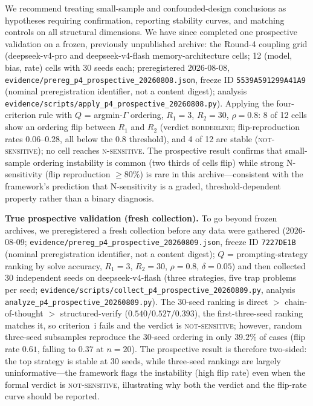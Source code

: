 \documentclass[11pt]{article}
\begin{document}
We recommend treating small-sample and confounded-design conclusions as hypotheses requiring confirmation, reporting stability curves, and matching controls on all structural dimensions. We have since completed one prospective validation on a frozen, previously unpublished archive: the Round-4 coupling grid (deepseek-v4-pro and deepseek-v4-flash memory-architecture cells; 12 (model, bias, rate) cells with 30 seeds each; preregistered 2026-08-08, \texttt{evidence/prereg\_p4\_prospective\_20260808.json}, freeze ID \texttt{5539A591299A41A9} (nominal preregistration identifier, not a content digest); analysis \texttt{evidence/scripts/apply\_p4\_prospective\_20260808.py}). Applying the four-criterion rule with $Q$ = argmin-$\Gamma$ ordering, $R_1{=}3$, $R_2{=}30$, $\rho{=}0.8$: 8 of 12 cells show an ordering flip between $R_1$ and $R_2$ (verdict \textsc{borderline}; flip-reproduction rates 0.06--0.28, all below the 0.8 threshold), and 4 of 12 are stable (\textsc{not-sensitive}); no cell reaches \textsc{n-sensitive}. The prospective result confirms that small-sample ordering instability is common (two thirds of cells flip) while strong N-sensitivity (flip reproduction $\geq 80\%$) is rare in this archive---consistent with the framework's prediction that N-sensitivity is a graded, threshold-dependent property rather than a binary diagnosis.

\noindent\textbf{True prospective validation (fresh collection).} To go beyond frozen archives, we preregistered a fresh collection before any data were gathered (2026-08-09; \texttt{evidence/prereg\_p4\_prospective\_20260809.json}, freeze ID \texttt{7227DE1B} (nominal preregistration identifier, not a content digest); $Q$ = prompting-strategy ranking by solve accuracy, $R_1{=}3$, $R_2{=}30$, $\rho{=}0.8$, $\delta{=}0.05$) and then collected 30 independent seeds on deepseek-v4-flash (three strategies, five trap problems per seed; \texttt{evidence/scripts/collect\_p4\_prospective\_20260809.py}, analysis \texttt{analyze\_p4\_prospective\_20260809.py}). The 30-seed ranking is direct $>$ chain-of-thought $>$ structured-verify ($0.540 / 0.527 / 0.393$), the first-three-seed ranking matches it, so criterion~i fails and the verdict is \textsc{not-sensitive}; however, random three-seed subsamples reproduce the 30-seed ordering in only $39.2\%$ of cases (flip rate $0.61$, falling to $0.37$ at $n{=}20$). The prospective result is therefore two-sided: the top strategy is stable at 30 seeds, while three-seed rankings are largely uninformative---the framework flags the instability (high flip rate) even when the formal verdict is \textsc{not-sensitive}, illustrating why both the verdict and the flip-rate curve should be reported.
\end{document}
